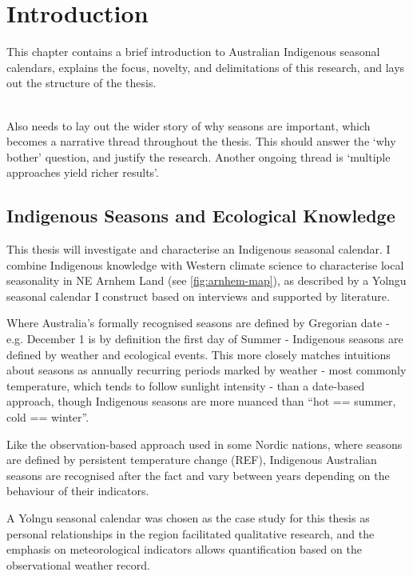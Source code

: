 \chapter{Introduction}
This chapter contains a brief introduction to Australian Indigenous seasonal calendars,
explains the focus, novelty, and delimitations of this research,
and lays out the structure of the thesis.

~\\

Also needs to lay out the wider story of why seasons are important,
which becomes a narrative thread throughout the thesis.
This should answer the `why bother' question, and justify the research.
%
Another ongoing thread is `multiple approaches yield richer results'.


\section{Indigenous Seasons and Ecological Knowledge}


This thesis will investigate and characterise an Indigenous seasonal calendar.
I combine Indigenous knowledge with Western climate science to characterise
local seasonality in NE Arnhem Land (see \autoref{fig:arnhem-map}),
as described by a Yolngu seasonal calendar I construct based on
interviews and supported by literature.


Where Australia's formally recognised seasons are defined by Gregorian date -
e.g. December 1 is by definition the first day of Summer - Indigenous seasons
are defined by weather and ecological events.
%
This more closely matches intuitions about seasons as annually recurring
periods marked by weather - most commonly temperature, which tends to
follow sunlight intensity - than a date-based approach, though Indigenous
seasons are more nuanced than ``hot == summer, cold == winter''.

Like the observation-based approach used in some Nordic nations, where
seasons are defined by persistent temperature change (REF),
Indigenous Australian seasons are recognised after the fact and vary
between years depending on the behaviour of their indicators.


A Yolngu seasonal calendar was chosen as the case study for this thesis
as personal relationships in the region facilitated qualitative research,
and the emphasis on meteorological indicators allows quantification based
on the observational weather record.


